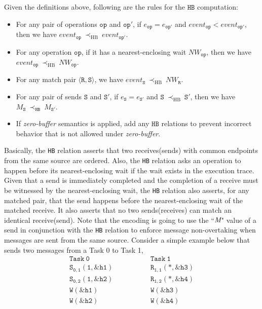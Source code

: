 Given the definitions above, following are the rules for the $\mathtt{HB}$ computation:
\begin{itemize}
\item For any pair of operations $\mathtt{op}$ and $\mathtt{op'}$, if $e_{\mathtt{op}} = e_{\mathtt{op'}}$ and $event_{\mathtt{op}}<event_{\mathtt{op'}}$, then we have $event_{\mathtt{op}}\ \mathrm{\prec_{HB}}\ event_{\mathtt{op'}}$.
\item For any operation $\mathtt{op}$, if it has a nearest-enclosing wait $NW_{\mathtt{op}}$, then we have $event_{\mathtt{op}}\ \mathrm{\prec_{HB}}\ NW_{\mathtt{op}}$.
\item For any match pair $\langle\mathtt{R},\mathtt{S}\rangle$, we have $event_{\mathtt{S}}\ \mathrm{\prec_{HB}}\ NW_{\mathtt{R}}$.
\item For any pair of sends $\mathtt{S}$ and $\mathtt{S'}$, if $e_{\mathtt{S}}=e_{\mathtt{S'}}$ and $\mathtt{S}\ \mathrm{\prec_{HB}}\ \mathtt{S'}$, then we have $M_{\mathtt{S}}\ \mathrm{\prec_{\mathtt{HB}}}\ M_{\mathtt{S'}}$.
\item If \textit{zero-buffer} semantics is applied, add any $\mathtt{HB}$ relations to prevent incorrect behavior that is not allowed under \textit{zero-buffer}.
\end{itemize}
Basically, the \texttt{HB} relation asserts that two receives(sends) with common endpoints from the same source are ordered. Also, the \texttt{HB} relation asks an operation to happen before its nearest-enclosing wait if the wait exists in the execution trace. Given that a send is immediately completed and the completion of a receive must be witnessed  by the nearest-enclosing wait, the \texttt{HB} relation also asserts, for any matched pair, that the send happens before the nearest-enclosing wait of the matched receive. It also asserts that no two sends(receives) can match an identical receive(send). Note that the encoding is going to use the ``$\emph{M}$"  value of a send in conjunction with the \texttt{HB} relation to enforce message non-overtaking when messages are sent from the same source. Consider a simple example below that sends two messages from a Task 0 to Task 1,
\[
\begin{array}{l|l}
\;\;\;\;\;\;\;\;\mathtt{Task\ 0}\;\;\;\;\;\;\;\; & \;\;\;\;\;\;\;\; \mathtt{Task\ 1}\;\;\;\;\;\;\;\; \\
\hline
\;\;\;\;\;\;\;\;\mathtt{S_{0,1}(1,\&h1)}\;\;\;\;\;\;\;\; & \;\;\;\;\;\;\;\; \mathtt{R_{1,1}(*,\&h3)}\;\;\;\;\;\;\;\; \\
\;\;\;\;\;\;\;\;\mathtt{S_{0,2}(1,\&h2)}\;\;\;\;\;\;\;\; & \;\;\;\;\;\;\;\; \mathtt{R_{1,2}(*,\&h4)}\;\;\;\;\;\;\;\; \\
\;\;\;\;\;\;\;\;\mathtt{W(\&h1)}\;\;\;\;\;\;\;\; & \;\;\;\;\;\;\;\; \mathtt{W(\&h3)}\;\;\;\;\;\;\;\; \\
\;\;\;\;\;\;\;\;\mathtt{W(\&h2)}\;\;\;\;\;\;\;\; & \;\;\;\;\;\;\;\; \mathtt{W(\&h4)}\;\;\;\;\;\;\;\; \\
\end{array}
\]
